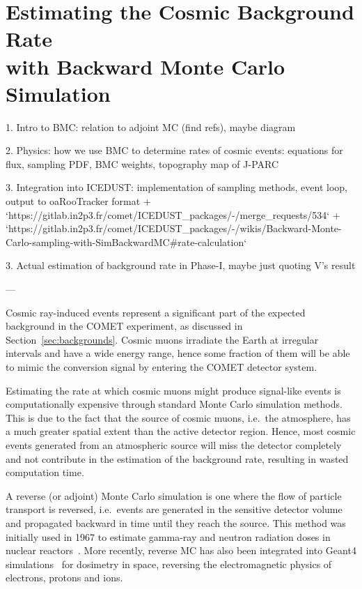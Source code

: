 \chapter[Estimating the Cosmic Background Rate with Backward Monte Carlo
Simulation]{Estimating the Cosmic Background Rate \\with Backward Monte Carlo
Simulation}\label{ch:cosmics}

\begin{markdown}

1. Intro to BMC: relation to adjoint MC (find refs), maybe diagram

2. Physics: how we use BMC to determine rates of cosmic events: equations for
flux, sampling PDF, BMC weights, topography map of J-PARC

3. Integration into ICEDUST: implementation of sampling methods, event loop, output to
oaRooTracker format
+ `https://gitlab.in2p3.fr/comet/ICEDUST_packages/-/merge_requests/534`
+ `https://gitlab.in2p3.fr/comet/ICEDUST_packages/-/wikis/Backward-Monte-Carlo-sampling-with-SimBackwardMC#rate-calculation`

3. Actual estimation of background rate in Phase-I, maybe just quoting V's
result

---

\end{markdown}

Cosmic ray-induced events represent a significant part of the expected
background in the COMET experiment, as discussed in
Section~\ref{sec:backgrounds}. Cosmic muons irradiate the Earth at irregular
intervals and have a wide energy range, hence some fraction of them will be able
to mimic the conversion signal by entering the COMET detector system. 

Estimating the rate at which cosmic muons might produce signal-like events is
computationally expensive through standard Monte Carlo simulation methods. This
is due to the fact that the source of cosmic muons, i.e.\ the atmosphere, has a
much greater spatial extent than the active detector region. Hence, most cosmic
events generated from an atmospheric source will miss the detector completely
and not contribute in the estimation of the background rate, resulting in wasted
computation time.

A reverse (or adjoint) Monte Carlo simulation is one where the flow of particle
transport is reversed, i.e.\ events are generated in the sensitive detector
volume and propagated backward in time until they reach the source. This method
was initially used in 1967 to estimate gamma-ray and neutron radiation doses in
nuclear reactors~\cite{doi:10.13182/NSE68-A19235,doi:10.13182/NSE69-A19116}.
More recently, reverse MC has also been integrated into Geant4
simulations~\cite{DESORGHER2010247} for dosimetry in space, reversing the
electromagnetic physics of electrons, protons and ions.

